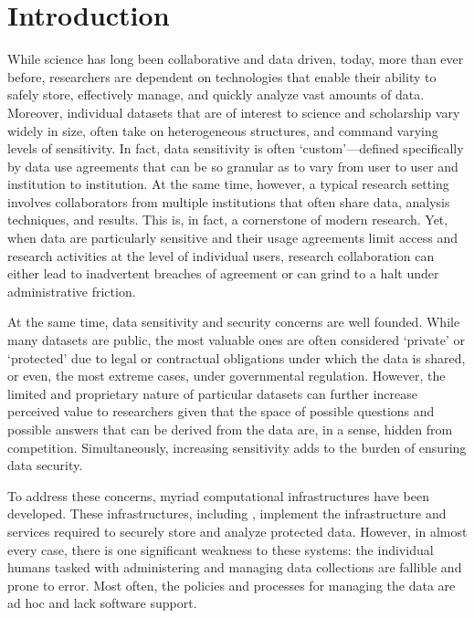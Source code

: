 \section{Introduction}



While science has long been collaborative and data driven, today, more than ever before,
researchers are dependent on technologies that enable their ability to safely store,
effectively manage, and quickly analyze vast amounts of
data. Moreover, individual datasets that are of interest to science and scholarship
vary widely in size, often take on heterogeneous structures, and command varying
levels of sensitivity. In fact, data sensitivity is often `custom'---defined specifically by
data use agreements that can be so granular as to vary from user to user and institution
to institution. At the same time, however, a typical research setting involves
collaborators from multiple institutions that often share data, analysis techniques,
and results. This is, in fact, a cornerstone of modern research. Yet, when data are
particularly sensitive and their usage agreements limit access and research activities at the
level of individual users, research collaboration can either lead to inadvertent
breaches of agreement or can grind to a halt under administrative friction.


At the same time, data sensitivity and security concerns are well founded. While many datasets are public, the most
valuable ones are often considered `private' or `protected' due to legal or contractual obligations under which the data
is shared, or even, the most extreme cases, under governmental regulation. However, the limited and proprietary nature
of particular datasets can further increase perceived value to researchers given that the space of possible
questions and possible answers that can be derived from the data are, in a sense, hidden from competition.
Simultaneously, increasing sensitivity adds to the burden of ensuring data security.


To address these concerns, myriad computational infrastructures
have been developed. These infrastructures, including \NAME \cite{babuji2016cloud},
implement the infrastructure and services required to securely store and analyze protected
data. However, in almost every case, there is one significant weakness to these systems: the individual humans tasked with administering and managing
data collections are fallible and prone to error. Most often, the policies and processes for managing
the data are ad hoc and lack software support.

